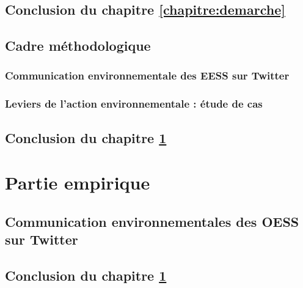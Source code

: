 \documentclass{Classe_Seba}
\begin{document}
            \chapter*{Conclusion du chapitre \ref{chapitre:demarche}}
                

            \chapter{Cadre méthodologique}
                \label{chapitre:methodes}
                \minitoc \newpage
                
                \section{Communication environnementale des EESS sur Twitter}
                    
                    
                \section{Leviers de l'action environnementale : étude de cas}
                    
            \chapter*{Conclusion du chapitre \ref{chapitre:methodes}}
                

        \whitepage
        \part{Partie empirique}
            \label{partie:terrain}

            \chapter{Communication environnementales des OESS sur Twitter}
                \label{chapitre:twitter}
                \minitoc \newpage
                    
                    
            \chapter*{Conclusion du chapitre \ref{chapitre:twitter}}
                
\end{document}
